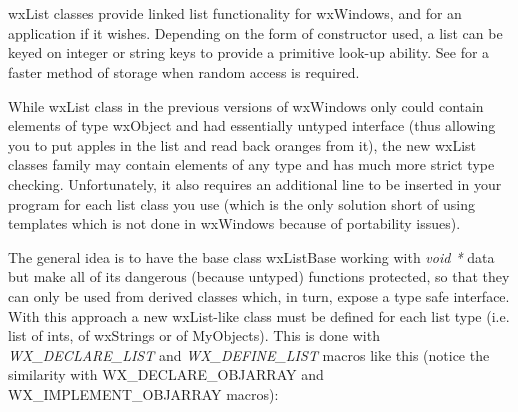 \section{}\label{wxlist}

wxList classes provide linked list functionality for wxWindows, and for an
application if it wishes.  Depending on the form of constructor used, a list
can be keyed on integer or string keys to provide a primitive look-up ability.
See \rtfsp for a faster method of storage
when random access is required.

While wxList class in the previous versions of wxWindows only could contain
elements of type wxObject and had essentially untyped interface (thus allowing
you to put apples in the list and read back oranges from it), the new wxList
classes family may contain elements of any type and has much more strict type
checking. Unfortunately, it also requires an additional line to be inserted in
your program for each list class you use (which is the only solution short of
using templates which is not done in wxWindows because of portability issues).

The general idea is to have the base class wxListBase working with {\it void *}
data but make all of its dangerous (because untyped) functions protected, so
that they can only be used from derived classes which, in turn, expose a type
safe interface. With this approach a new wxList-like class must be defined for
each list type (i.e. list of ints, of wxStrings or of MyObjects). This is done
with {\it WX\_DECLARE\_LIST} and {\it WX\_DEFINE\_LIST} macros like this
(notice the similarity with WX\_DECLARE\_OBJARRAY and WX\_IMPLEMENT\_OBJARRAY
macros):


